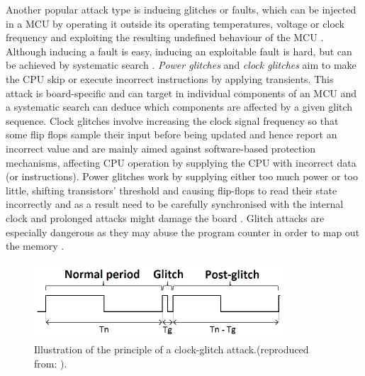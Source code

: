 	
	Another popular attack type is inducing glitches or faults, which can be injected in a MCU by operating it outside its operating temperatures, voltage or clock frequency and exploiting the resulting undefined behaviour of the MCU \citep{sergei:thesis} \citep{avr_mega}. Although inducing a fault is easy, inducing an exploitable fault is hard, but can be achieved by systematic search \citep{sergei:thesis} \citep{glitches_paper} \citep{website:riscure}. \emph{Power glitches} and \emph{clock glitches} aim to make the CPU skip or execute incorrect instructions by applying transients. This attack is board-specific and can target in individual components of an MCU and a systematic search can deduce which components are affected by a given glitch sequence. Clock glitches involve increasing the clock signal frequency so that some flip flops sample their input before being updated and hence report an incorrect value \citep{sergei:thesis} and are mainly aimed against software-based protection mechanisms, affecting CPU operation by supplying the CPU with incorrect data (or instructions). Power glitches work by supplying either too much power or too little, shifting transistors' threshold and causing flip-flops to read their state incorrectly and as a result need to be carefully synchronised with the internal clock and prolonged attacks might damage the board \citep{sergei:thesis}. Glitch attacks are especially dangerous as they may abuse the program counter in order to map out the memory \citep{glitches_paper} \citep{anderson:cautionary_note} \citep{sergei:thesis}.

	\begin{figure}
		\center
		\includegraphics[scale=0.7]{img/clock_glitch.png}
		\caption{\footnotesize Illustration of the principle of a clock-glitch attack.(reproduced from: \protect\citep{glitches_paper}).}
		\label{fig:glitch}		
	\end{figure}

